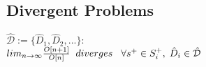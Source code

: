 \documentclass[11pt]{article}
\begin{document}
\subsection{Divergent Problems}
\begin{center}
$
\mathcal{\hat{D}} := \{ \hat{D}_1,\hat{D}_2,...\} :
$
\\ \vspace{2mm}
$
lim_{n \rightarrow \infty} \frac{O[n+1]}{O[n]} \hspace{2mm} diverges \hspace{3mm} \forall s^+ \in S^+_i, \hspace{1mm} \hat{D}_i \in \hat{\mathcal{D}}
$
\end{center}











\end{document}
